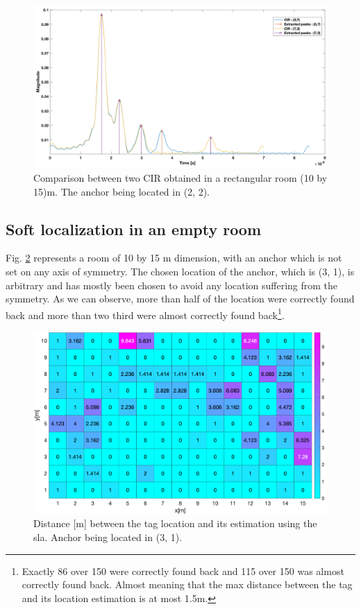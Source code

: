 \begin{figure}[H]
\centering
\includegraphics[width=.9\linewidth]{Images/cir_comparison_rect.png}
\caption{Comparison between two CIR obtained in a rectangular room (10 by 15)m. The anchor being located in (2, 2). \label{fig:rect_sym}}
\end{figure}

\subsection{Soft localization in an empty room}
\label{soft_empty_room}
Fig. \ref{fig:pos_ant_empty_non_sym} represents a room of 10 by 15 m dimension, with an anchor which is not set on any axis of symmetry. The chosen location of the anchor, which is (3, 1), is arbitrary and has mostly been chosen to avoid any location suffering from the symmetry. As we can observe, more than half of the location were correctly found back and more than two third were almost correctly found back\footnote{Exactly 86 over 150 were correctly found back and 115 over 150 was almost correctly found back. Almost meaning that the max distance between the tag and its location estimation is at most 1.5m.}.

\begin{figure}[H]
\centering
\includegraphics[width=\linewidth]{Images/no_more_name_idea.png}
\caption{Distance [m] between the tag location and its estimation using the \gls{sla}. Anchor being located in (3, 1). \label{fig:pos_ant_empty_non_sym}}
\end{figure}

